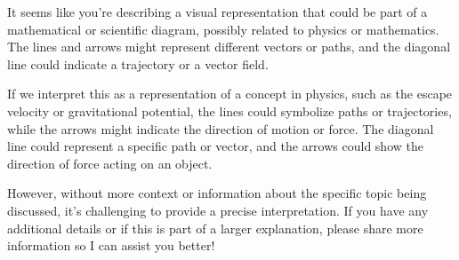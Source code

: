 It seems like you're describing a visual representation that could be part of a mathematical or scientific diagram, possibly related to physics or mathematics. The lines and arrows might represent different vectors or paths, and the diagonal line could indicate a trajectory or a vector field.

If we interpret this as a representation of a concept in physics, such as the escape velocity or gravitational potential, the lines could symbolize paths or trajectories, while the arrows might indicate the direction of motion or force. The diagonal line could represent a specific path or vector, and the arrows could show the direction of force acting on an object.

However, without more context or information about the specific topic being discussed, it's challenging to provide a precise interpretation. If you have any additional details or if this is part of a larger explanation, please share more information so I can assist you better!